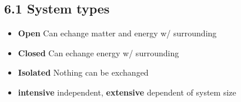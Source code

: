 \subsection{6.1 System types}
    \begin{itemize}
        \itemsep0em
        \item \textbf{Open} Can echange matter and energy w/ surrounding
        \item \textbf{Closed} Can echange energy w/ surrounding
        \item \textbf{Isolated} Nothing can be exchanged
        \item \textbf{intensive} independent, \textbf{extensive} dependent of system size
    \end{itemize}